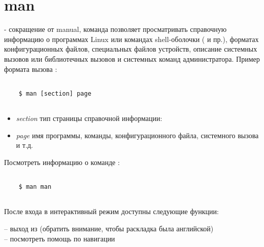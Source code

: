 \section{man}

\noindent
{} - сокращение от manual, команда позволяет просматривать справочную информацию о программах Linux или командах shell-оболочки ( и пр.), форматах конфигурационных файлов, специальных файлов устройств, описание системных вызовов или библиотечных вызовов и системных команд администратора. Пример формата вызова :

\begin{lstlisting}
	
	$ man [section] page
	
\end{lstlisting}	

\begin{itemize}	
	\item \textit{section} тип страницы справочной информации:
	
	\subitem {}
	\subitem {}
	\subitem {}
	\subitem {}
	\subitem {}
	\subitem {}
	\subitem {}
	\subitem {}

	\item \textit{page} имя программы, команды, конфигурационного файла, системного вызова и т.д.
\end{itemize}

Посмотреть информацию о команде :
\begin{lstlisting}
	
	$ man man
	
\end{lstlisting}

После входа в интерактивный режим  доступны следующие функции:

\noindent{} -- выход из  (обратить внимание, чтобы раскладка была английской) \\
 -- посмотреть помощь по навигации  \\

